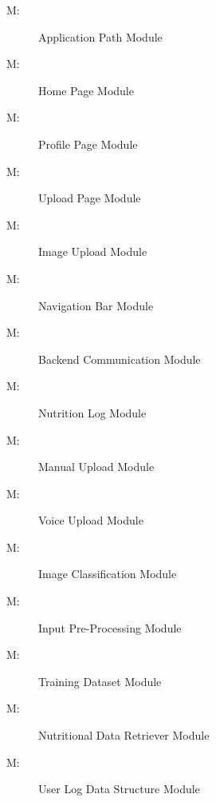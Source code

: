 \documentclass[12pt, titlepage]{article}
\newcounter{mnum}
\newcommand{\mthemnum}{M\themnum}
\begin{document}
\begin{description}
\item [ \mthemnum \label{mHH}:] Application Path Module
\item  [ \mthemnum \label{mHH}:] Home Page Module
\item  [ \mthemnum \label{mHH}:] Profile Page Module
\item  [ \mthemnum \label{mHH}:] Upload Page Module
\item  [ \mthemnum \label{mHH}:] Image Upload Module
\item  [ \mthemnum \label{mHH}:] Navigation Bar Module
\item  [ \mthemnum \label{mHH}:] Backend Communication Module
\item  [ \mthemnum \label{mHH}:] Nutrition Log Module
\item  [ \mthemnum \label{mHH}:] Manual Upload Module
\item  [ \mthemnum \label{mHH}:] Voice Upload Module
\item  [ \mthemnum \label{mHH}:] Image Classification Module
\item  [ \mthemnum \label{mHH}:] Input Pre-Processing Module
\item  [ \mthemnum \label{mHH}:] Training Dataset Module
\item  [ \mthemnum \label{mHH}:] Nutritional Data Retriever Module
\item  [ \mthemnum \label{mHH}:] User Log Data Structure Module
\end{description}
\end{document}
